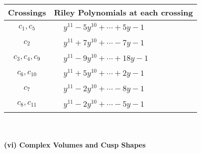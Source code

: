 \documentclass[1p]{elsarticle_modified}
\theoremstyle{definition}
\begin{document}
\begin{tabular}{m{50pt}|m{274pt}}
Crossings & \hspace{64pt}Riley Polynomials at each crossing \\
\hline $$\begin{aligned}c_{1},c_{5}\end{aligned}$$&$\begin{aligned}
&y^{11}-5 y^{10}+\cdots+5 y-1
\end{aligned}$\\
\hline $$\begin{aligned}c_{2}\end{aligned}$$&$\begin{aligned}
&y^{11}+7 y^{10}+\cdots-7 y-1
\end{aligned}$\\
\hline $$\begin{aligned}c_{3},c_{4},c_{9}\end{aligned}$$&$\begin{aligned}
&y^{11}-9 y^{10}+\cdots+18 y-1
\end{aligned}$\\
\hline $$\begin{aligned}c_{6},c_{10}\end{aligned}$$&$\begin{aligned}
&y^{11}+5 y^{10}+\cdots+2 y-1
\end{aligned}$\\
\hline $$\begin{aligned}c_{7}\end{aligned}$$&$\begin{aligned}
&y^{11}-2 y^{10}+\cdots-8 y-1
\end{aligned}$\\
\hline $$\begin{aligned}c_{8},c_{11}\end{aligned}$$&$\begin{aligned}
&y^{11}-2 y^{10}+\cdots-5 y-1
\end{aligned}$\\
\hline
\end{tabular}\\~\\
\newpage\flushleft \textbf{(vi) Complex Volumes and Cusp Shapes}
\end{document}
